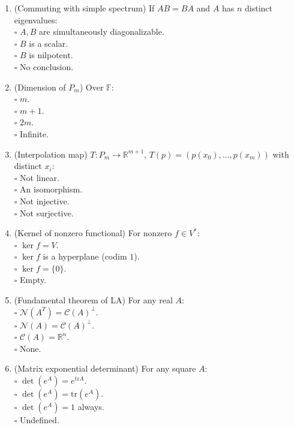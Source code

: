 \documentclass[11pt]{article}
\theoremstyle{upright}
\begin{document}
\begin{enumerate}
\item (Commuting with simple spectrum) If $AB=BA$ and $A$ has $n$ distinct eigenvalues:\\
\(\square\) $A,B$ are simultaneously diagonalizable.\\
\(\square\) $B$ is a scalar.\\
\(\square\) $B$ is nilpotent.\\
\(\square\) No conclusion.

\item (Dimension of $P_m$) Over $\mathbb{F}$:\\
\(\square\) $m$.\\
\(\square\) $m+1$.\\
\(\square\) $2m$.\\
\(\square\) Infinite.

\item (Interpolation map) $T:P_m\to\mathbb{R}^{m+1}$, $T(p)=(p(x_0),\dots,p(x_m))$ with distinct $x_i$:\\
\(\square\) Not linear.\\
\(\square\) An isomorphism.\\
\(\square\) Not injective.\\
\(\square\) Not surjective.

\item (Kernel of nonzero functional) For nonzero $f\in V^*$:\\
\(\square\) $\ker f=V$.\\
\(\square\) $\ker f$ is a hyperplane (codim $1$).\\
\(\square\) $\ker f=\{0\}$.\\
\(\square\) Empty.

\item (Fundamental theorem of LA) For any real $A$:\\
\(\square\) $\mathcal{N}(A^T)=\mathcal{C}(A)^\perp$.\\
\(\square\) $\mathcal{N}(A)=\mathcal{C}(A)^\perp$.\\
\(\square\) $\mathcal{C}(A)=\mathbb{R}^n$.\\
\(\square\) None.

\item (Matrix exponential determinant) For any square $A$:\\
\(\square\) $\det(e^A)=e^{\mathrm{tr}A}$.\\
\(\square\) $\det(e^A)=\mathrm{tr}(e^A)$.\\
\(\square\) $\det(e^A)=1$ always.\\
\(\square\) Undefined.


\end{enumerate}
\end{document}

